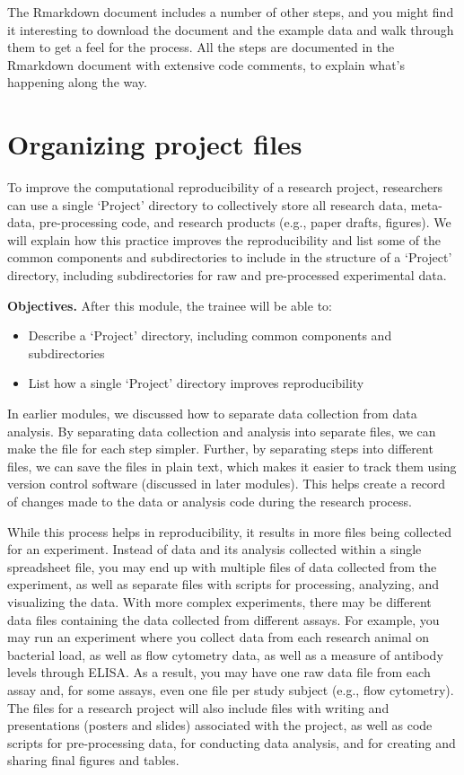 \documentclass[]{tufte-book}
\providecommand{\tightlist}{%
  \setlength{\itemsep}{0pt}\setlength{\parskip}{0pt}}
\begin{document}
The Rmarkdown document includes a number of other steps, and you might find
it interesting to download the document and the example data and walk through
them to get a feel for the process. All the steps are documented in the
Rmarkdown document with extensive code comments, to explain what's happening
along the way.

\section{Organizing project files}\label{module6}

To improve the computational reproducibility of a research project, researchers
can use a single `Project' directory to collectively store all research data,
meta-data, pre-processing code, and research products (e.g., paper drafts,
figures). We will explain how this practice improves the reproducibility and
list some of the common components and subdirectories to include in the
structure of a `Project' directory, including subdirectories for raw and
pre-processed experimental data.

\textbf{Objectives.} After this module, the trainee will be able to:

\begin{itemize}
\tightlist
\item
  Describe a `Project' directory, including common components and subdirectories
\item
  List how a single `Project' directory improves reproducibility
\end{itemize}

In earlier modules, we discussed how to separate data collection from data
analysis. By separating data collection and analysis into separate files, we can
make the file for each step simpler. Further, by separating steps into different
files, we can save the files in plain text, which makes it easier to track them
using version control software (discussed in later modules). This helps create a
record of changes made to the data or analysis code during the research process.

While this process helps in reproducibility, it results in more files being
collected for an experiment. Instead of data and its analysis collected within a
single spreadsheet file, you may end up with multiple files of data collected
from the experiment, as well as separate files with scripts for processing,
analyzing, and visualizing the data. With more complex experiments, there may be
different data files containing the data collected from different assays. For example,
you may run an experiment where you collect data from each research animal on
bacterial load, as well as flow cytometry data, as well as a measure of antibody
levels through ELISA. As a result, you may have one raw data file from each
assay and, for some assays, even one file per study subject (e.g., flow
cytometry). The files for a research project will also include files with
writing and presentations (posters and slides) associated with the project, as
well as code scripts for pre-processing data, for conducting data analysis, and
for creating and sharing final figures and tables.
\end{document}
